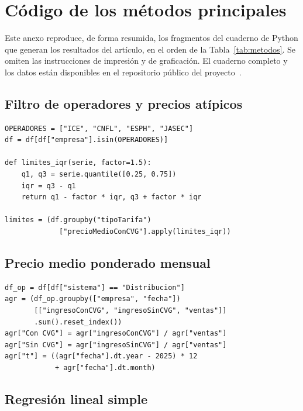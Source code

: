 \documentclass[conference]{IEEEtran}
\begin{document}
\appendices
\section{C\'odigo de los m\'etodos principales}
\label{ap:codigo}

Este anexo reproduce, de forma resumida, los fragmentos del cuaderno de Python que generan los resultados del art\'iculo, en el orden de la Tabla~\ref{tab:metodos}. Se omiten las instrucciones de impresi\'on y de graficaci\'on. El cuaderno completo y los datos est\'an disponibles en el repositorio p\'ublico del proyecto~\cite{repo}.

\subsection{Filtro de operadores y precios at\'ipicos}

{\scriptsize
\begin{verbatim}
OPERADORES = ["ICE", "CNFL", "ESPH", "JASEC"]
df = df[df["empresa"].isin(OPERADORES)]

def limites_iqr(serie, factor=1.5):
    q1, q3 = serie.quantile([0.25, 0.75])
    iqr = q3 - q1
    return q1 - factor * iqr, q3 + factor * iqr

limites = (df.groupby("tipoTarifa")
             ["precioMedioConCVG"].apply(limites_iqr))
\end{verbatim}
}

\subsection{Precio medio ponderado mensual}

{\scriptsize
\begin{verbatim}
df_op = df[df["sistema"] == "Distribucion"]
agr = (df_op.groupby(["empresa", "fecha"])
       [["ingresoConCVG", "ingresoSinCVG", "ventas"]]
       .sum().reset_index())
agr["Con CVG"] = agr["ingresoConCVG"] / agr["ventas"]
agr["Sin CVG"] = agr["ingresoSinCVG"] / agr["ventas"]
agr["t"] = ((agr["fecha"].dt.year - 2025) * 12
            + agr["fecha"].dt.month)
\end{verbatim}
}

\subsection{Regresi\'on lineal simple}
\end{document}
